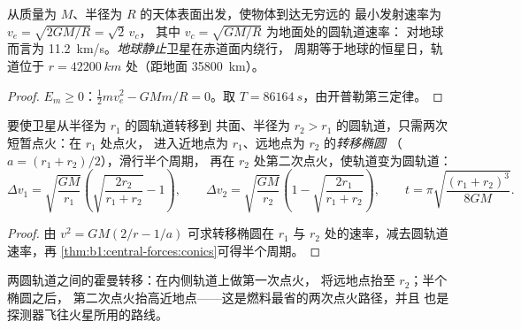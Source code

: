 \begin{proposition}\label{prop:b1:central-forces:escape}
从质量为 $M$、半径为 $R$ 的天体表面出发，使物体到达无穷远的
最小发射速率为 $v_e = \sqrt{2GM/R} = \sqrt2\,v_c$，
其中 $v_c = \sqrt{GM/R}$ 为地面处的圆轨道速率：
对地球而言为 \qty{11.2}{km/s}。\emph{地球静止}卫星在赤道面内绕行，
周期等于地球的恒星日，轨道位于
$r = \qty{42200}{km}$ 处（距地面 \qty{35800}{km}）。
\end{proposition}

\begin{proof}
$E_m \geq 0$：$\tfrac12 mv_e^2 - GMm/R = 0$。取 $T = \qty{86164}{s}$，由开普勒第三定律。
\end{proof}

\begin{proposition}[霍曼转移]\label{prop:b1:central-forces:hohmann}
要使卫星从半径为 $r_1$ 的圆轨道转移到
共面、半径为 $r_2 > r_1$ 的圆轨道，只需两次短暂点火：在 $r_1$ 处点火，
进入近地点为 $r_1$、远地点为 $r_2$ 的\emph{转移椭圆}
（$a = (r_1 + r_2)/2$），滑行半个周期，
再在 $r_2$ 处第二次点火，使轨道变为圆轨道：
\[
\Delta v_1 = \sqrt{\frac{GM}{r_1}}\left(\sqrt{\frac{2r_2}{r_1 + r_2}} - 1\right),
\qquad
\Delta v_2 = \sqrt{\frac{GM}{r_2}}\left(1 - \sqrt{\frac{2r_1}{r_1 + r_2}}\right),
\qquad
t = \pi\sqrt{\frac{(r_1 + r_2)^3}{8GM}} .
\]
\end{proposition}

\begin{proof}
由 $v^2 = GM(2/r - 1/a)$ 可求转移椭圆在 $r_1$ 与
$r_2$ 处的速率，减去圆轨道速率，再
\cref{thm:b1:central-forces:conics}可得半个周期。
\end{proof}

\begin{omfigure}

{\small 两圆轨道之间的霍曼转移：在内侧轨道上做第一次点火，
将远地点抬至 $r_2$；半个椭圆之后，
第二次点火抬高近地点——这是燃料最省的两次点火路径，并且
也是探测器飞往火星所用的路线。}
\end{omfigure}

